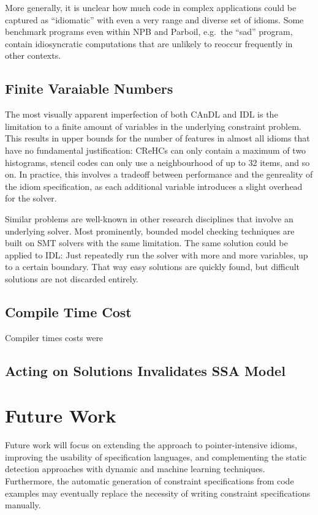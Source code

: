     More generally, it is unclear how much code in complex applications could
    be captured as ``idiomatic'' with even a very range and diverse set of
    idioms.
    Some benchmark programs even within NPB and Parboil, e.g.\ the ``sad''
    program, contain idiosyncratic computations that are unlikely to reoccur
    frequently in other contexts.

\subsection*{Finite Varaiable Numbers}

    The most visually apparent imperfection of both CAnDL and IDL is the
    limitation to a finite amount of variables in the underlying constraint
    problem.
    This results in upper bounds for the number of features in almost all idioms
    that have no fundamental justification:
    CReHCs can only contain a maximum of two histograms, stencil codes can only
    use a neighbourhood of up to 32 items, and so on.
    In practice, this involves a tradeoff between performance and the genreality
    of the idiom specification, as each additional variable introduces a slight
    overhead for the solver.

    Similar problems are well-known in other research disciplines that involve
    an underlying solver.
    Most prominently, bounded model checking techniques are built on SMT solvers
    with the same limitation.
    The same solution could be applied to IDL: Just repeatedly run the solver
    with more and more variables, up to a certain boundary.
    That way easy solutions are quickly found, but difficult solutions are not
    discarded entirely.

\subsection*{Compile Time Cost}

    Compiler times costs were 

\subsection*{Acting on Solutions Invalidates SSA Model}

\section{Future Work}

    Future work will focus on extending the approach to pointer-intensive
    idioms, improving the usability of specification languages, and
    complementing the static detection approaches with dynamic and
    machine learning techniques.
    Furthermore, the automatic generation of constraint specifications from
    code examples may eventually replace the necessity of writing constraint
    specifications manually.

